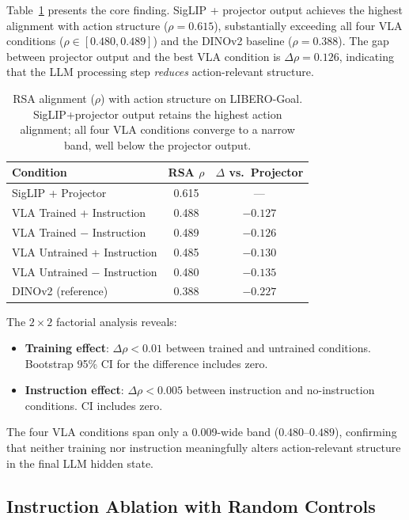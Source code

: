 \documentclass[letterpaper]{article}
\begin{document}
Table~\ref{tab:main_rsa} presents the core finding.
SigLIP + projector output achieves the highest alignment with action structure ($\rho=0.615$), substantially exceeding all four VLA conditions ($\rho\in[0.480, 0.489]$) and the DINOv2 baseline ($\rho=0.388$).
The gap between projector output and the best VLA condition is $\Delta\rho=0.126$, indicating that the LLM processing step \emph{reduces} action-relevant structure.

\begin{table}[t]
\centering
\caption{RSA alignment ($\rho$) with action structure on LIBERO-Goal. SigLIP+projector output retains the highest action alignment; all four VLA conditions converge to a narrow band, well below the projector output.}
\label{tab:main_rsa}
\begin{tabular}{lcc}
\toprule
\textbf{Condition} & \textbf{RSA $\rho$} & \textbf{$\Delta$ vs.\ Projector} \\
\midrule
SigLIP + Projector & 0.615 & --- \\
\midrule
VLA Trained + Instruction & 0.488 & $-0.127$ \\
VLA Trained $-$ Instruction & 0.489 & $-0.126$ \\
VLA Untrained + Instruction & 0.485 & $-0.130$ \\
VLA Untrained $-$ Instruction & 0.480 & $-0.135$ \\
\midrule
DINOv2 (reference) & 0.388 & $-0.227$ \\
\bottomrule
\end{tabular}
\end{table}

The $2 \times 2$ factorial analysis reveals:
\begin{itemize}
    \item \textbf{Training effect}: $\Delta\rho < 0.01$ between trained and untrained conditions. Bootstrap 95\% CI for the difference includes zero.
    \item \textbf{Instruction effect}: $\Delta\rho < 0.005$ between instruction and no-instruction conditions. CI includes zero.
\end{itemize}
The four VLA conditions span only a 0.009-wide band ($0.480$--$0.489$), confirming that neither training nor instruction meaningfully alters action-relevant structure in the final LLM hidden state.

\subsection{Instruction Ablation with Random Controls}
\label{sec:exp_random_inst}
\end{document}
